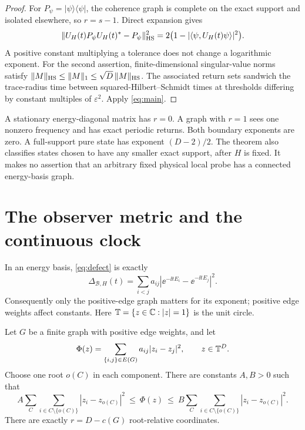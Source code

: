 \begin{proof}
For $P_\psi=|\psi\rangle\langle\psi|$, the coherence graph is complete on
the exact support and isolated elsewhere, so $r=s-1$. Direct expansion
gives
\[
 \|U_H(t)P_\psi U_H(t)^*-P_\psi\|_{\mathrm{HS}}^2
       =2\bigl(1-|\langle\psi,U_H(t)\psi\rangle|^2\bigr).
\]
A positive constant multiplying a tolerance does not change a logarithmic
exponent. For the second assertion, finite-dimensional singular-value
norms satisfy $\|M\|_{\mathrm{HS}}\leq\|M\|_1\leq\sqrt D\,\|M\|_{\mathrm{HS}}$.
The associated return sets sandwich the trace-radius time between
squared-Hilbert--Schmidt times at thresholds differing by constant
multiples of $\varepsilon^2$. Apply \eqref{eq:main}.
\end{proof}

A stationary energy-diagonal matrix has $r=0$. A graph with $r=1$ sees
one nonzero frequency and has exact periodic returns. Both boundary
exponents are zero. A full-support pure state has exponent $(D-2)/2$.
The theorem also classifies states chosen to have any smaller exact
support, after $H$ is fixed. It makes no assertion that an arbitrary
fixed physical local probe has a connected energy-basis graph.

\section{The observer metric and the continuous clock}

In an energy basis, \eqref{eq:defect} is exactly
\begin{equation}
 \Delta_{\mathcal B,H}(t)
   =\sum_{i<j}a_{ij}
      |\ee^{-\ii tE_i}-\ee^{-\ii tE_j}|^2.
 \label{eq:graph-energy}
\end{equation}
Consequently only the positive-edge graph matters for its exponent;
positive edge weights affect constants. Here
$\mathbb T=\{z\in\mathbb C:|z|=1\}$ is the unit circle.

\begin{lemma}\label{lem:forest}
Let $G$ be a finite graph with positive edge weights, and let
\[
 \Phi(z)=\sum_{\{i,j\}\in E(G)}a_{ij}|z_i-z_j|^2,
 \qquad z\in\mathbb T^D.
\]
Choose one root $o(C)$ in each component. There are constants $A,B>0$
such that
\begin{equation}
 A\sum_C\sum_{i\in C\setminus\{o(C)\}}|z_i-z_{o(C)}|^2
 \ \leq\ \Phi(z)\ \leq\
 B\sum_C\sum_{i\in C\setminus\{o(C)\}}|z_i-z_{o(C)}|^2.
 \label{eq:forest}
\end{equation}
There are exactly $r=D-c(G)$ root-relative coordinates.
\end{lemma}

